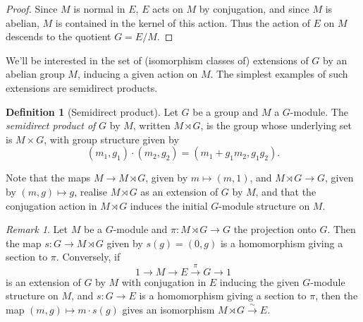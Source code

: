 \documentclass[11pt]{amsart}
\numberwithin{equation}{section}
\theoremstyle{remark}
\newtheorem{remark}[equation]{Remark}
\theoremstyle{remark}
\theoremstyle{remark}
\theoremstyle{definition}
\theoremstyle{definition}
\theoremstyle{definition}
\newtheorem{defi}[equation]{Definition}
\theoremstyle{definition}
\theoremstyle{definition}
\theoremstyle{definition}
\begin{document}
\begin{proof}
Since $M$ is normal in $E$, $E$ acts on $M$ by conjugation, and since $M$ is abelian, $M$ is contained in the kernel of this action. Thus the action of $E$ on $M$ descends to the quotient $G=E/M$.  
\end{proof}

We'll be interested in the set of (isomorphism classes of) extensions of $G$ by an abelian group $M$, inducing a given action on $M$. The simplest examples of such extensions are semidirect products.

\begin{defi}[Semidirect product]
Let $G$ be a group and $M$ a $G$-module. The \textit{semidirect product of }$G$ by $M$, written $M\rtimes G$, is the group whose underlying set is $M\times G$, with group structure given by
\[(m_1,g_1)\cdot (m_2,g_2)=(m_1+g_1m_2,g_1g_2).\]

Note that the maps $M\rightarrow M\rtimes G$, given by $m\mapsto (m,1)$, and $M\rtimes G\rightarrow G$, given by $(m,g)\mapsto g$, realise $M\rtimes G$ as an extension of $G$ by $M$, and that the conjugation action in $M\rtimes G$ induces the initial $G$-module structure on $M$.
\end{defi}

\begin{remark}
Let $M$ be a $G$-module and $\pi:M\rtimes G\rightarrow G$ the projection onto $G$. Then the map $s:G\rightarrow M\rtimes G$ given by $s(g)=(0,g)$ is a homomorphism giving a section to $\pi$. Conversely, if 
\[1\longrightarrow M \longrightarrow E \stackrel{\pi}{\longrightarrow} G\longrightarrow 1\]
is an extension of $G$ by $M$ with conjugation in $E$ inducing the given $G$-module structure on $M$, and $s:G\rightarrow E$ is a homomorphism giving a section to $\pi$, then the map $(m,g)\mapsto m\cdot s(g)$
gives an isomorphism $M\rtimes G\stackrel{\sim}{\longrightarrow } E$. 
\end{remark}
\end{document}
